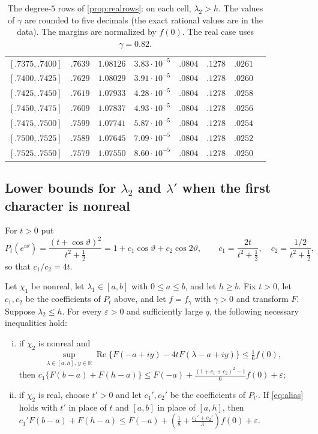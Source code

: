 \documentclass[11pt]{amsart}
\numberwithin{equation}{section}
\theoremstyle{plain}
\theoremstyle{definition}
\theoremstyle{remark}
\newcommand{\RR}{\mathbb{R}}
\renewcommand{\Re}{\operatorname{Re}}
\newcommand{\eps}{\varepsilon}
\newcommand{\1}{\mathbf{1}}
\begin{document}
\begin{table}[ht]
\begin{tabular}{@{}cccccccc@{}}
$[.7375,.7400]$ & $.7639$ & $1.08126$ & $3.83\cdot10^{-5}$ & $.0804$ & $.1278$ & $.0261$\\
$[.7400,.7425]$ & $.7629$ & $1.08029$ & $3.91\cdot10^{-5}$ & $.0804$ & $.1278$ & $.0260$\\
$[.7425,.7450]$ & $.7619$ & $1.07933$ & $4.28\cdot10^{-5}$ & $.0804$ & $.1278$ & $.0258$\\
$[.7450,.7475]$ & $.7609$ & $1.07837$ & $4.93\cdot10^{-5}$ & $.0804$ & $.1278$ & $.0256$\\
$[.7475,.7500]$ & $.7599$ & $1.07741$ & $5.87\cdot10^{-5}$ & $.0804$ & $.1278$ & $.0254$\\
$[.7500,.7525]$ & $.7589$ & $1.07645$ & $7.09\cdot10^{-5}$ & $.0804$ & $.1278$ & $.0252$\\
$[.7525,.7550]$ & $.7579$ & $1.07550$ & $8.60\cdot10^{-5}$ & $.0804$ & $.1278$ & $.0250$\\
\bottomrule
\end{tabular}
\caption{The degree-$5$ rows of \cref{prop:realrows}: on each cell, $\lambda_2>h$. The values of $\gamma$
are rounded to five decimals (the exact rational values are in the data). The margins are
normalized by $f(0)$. The real case uses $\gamma=0.82$.}
\label{tab:realrows}
\end{table}

\subsection{Lower bounds for \texorpdfstring{$\lambda_2$}{lambda2} and \texorpdfstring{$\lambda'$}{lambda'} when the first character is nonreal}
For $t>0$ put
\[
  P_t(e^{i\vartheta})=\frac{(t+\cos\vartheta)^2}{t^2+\frac12}=1+c_1\cos\vartheta+c_2\cos2\vartheta,\qquad
  c_1=\frac{2t}{t^2+\frac12},\quad c_2=\frac{1/2}{t^2+\frac12},
\]
so that $c_1/c_2=4t$.

\begin{proposition}\label{prop:complexrows}
Let $\chi_1$ be nonreal, let $\lambda_1\in[a,b]$ with $0\le a\le b$, and let $h\ge b$.
Fix $t>0$, let $c_1,c_2$ be the coefficients of $P_t$ above, and let
$f=f_\gamma$ with $\gamma>0$ and transform $F$.
Suppose $\lambda_2\le h$. For every $\eps>0$ and sufficiently large $q$, the following
necessary inequalities hold:
\begin{enumerate}[(i)]
  \item if $\chi_2$ is nonreal and
    \begin{equation}\label{eq:alias}
      \sup_{\lambda\in[a,h],\,y\in\RR}\Re\{F(-a+iy)-4tF(\lambda-a+iy)\}\le\tfrac16f(0),
    \end{equation}
    then $c_1\{F(b-a)+F(h-a)\}\le F(-a)+\frac{(1+c_1+c_2)^2-1}6f(0)+\eps$;
  \item if $\chi_2$ is real, choose $t'>0$ and let $c_1',c_2'$ be the coefficients of $P_{t'}$.
    If \eqref{eq:alias} holds with $t'$ in place of $t$ and $[a,b]$ in place of
    $[a,h]$, then $c_1'F(b-a)+F(h-a)\le F(-a)+(\frac18+\frac{c_1'+c_2'}3)f(0)+\eps$.
\end{enumerate}
\end{proposition}
\end{document}
